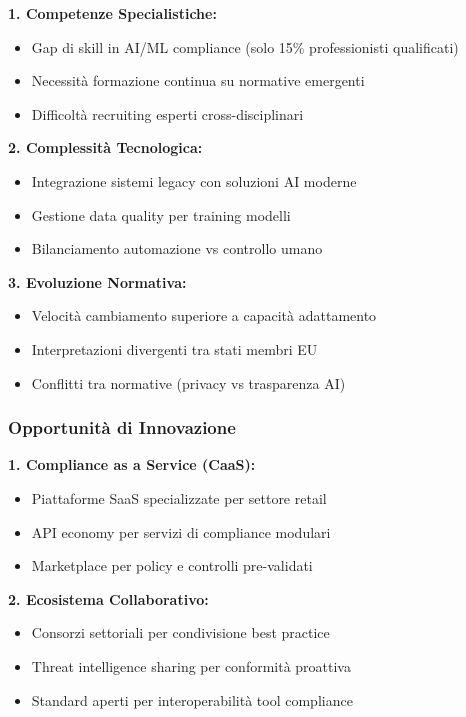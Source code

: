 \textbf{1. Competenze Specialistiche:}
\begin{itemize}
    \item Gap di skill in AI/ML compliance (solo 15\% professionisti qualificati)
    \item Necessità formazione continua su normative emergenti
    \item Difficoltà recruiting esperti cross-disciplinari
\end{itemize}

\textbf{2. Complessità Tecnologica:}
\begin{itemize}
    \item Integrazione sistemi legacy con soluzioni AI moderne
    \item Gestione data quality per training modelli
    \item Bilanciamento automazione vs controllo umano
\end{itemize}

\textbf{3. Evoluzione Normativa:}
\begin{itemize}
    \item Velocità cambiamento superiore a capacità adattamento
    \item Interpretazioni divergenti tra stati membri EU
    \item Conflitti tra normative (privacy vs trasparenza AI)
\end{itemize}

\subsubsection{Opportunità di Innovazione}

\textbf{1. Compliance as a Service (CaaS):}
\begin{itemize}
    \item Piattaforme SaaS specializzate per settore retail
    \item API economy per servizi di compliance modulari
    \item Marketplace per policy e controlli pre-validati
\end{itemize}

\textbf{2. Ecosistema Collaborativo:}
\begin{itemize}
    \item Consorzi settoriali per condivisione best practice
    \item Threat intelligence sharing per conformità proattiva
    \item Standard aperti per interoperabilità tool compliance
\end{itemize}


